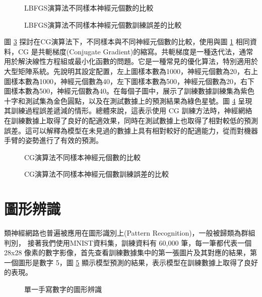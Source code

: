 \begin{figure}[h]
    \caption{LBFGS演算法不同樣本神經元個數的比較}
    \label{fig:LBFGS演算法不同樣本神經元個數的比較}
\end{figure}
\begin{figure}[H]
    \caption{LBFGS演算法不同樣本神經元個數訓練誤差的比較}
    \label{fig:LBFGS演算法不同樣本神經元個數訓練誤差的比較}
\end{figure}

圖 \ref{fig:CG演算法不同樣本神經元個數的比較} 探討在CG演算法下，不同樣本與不同神經元個數的比較，使用與圖 \ref{fig:LBFGS演算法不同樣本神經元個數的比較} 相同資料，CG 是共軛梯度(Conjugate Gradient)的縮寫。共軛梯度是一種迭代法，通常用於解決線性方程組或最小化函數的問題。它是一種常見的優化算法，特別適用於大型矩陣系統。先說明其設定配置，左上圖樣本數為1000，神經元個數為20，右上圖樣本數為1000，神經元個數為40，左下圖樣本數為500，神經元個數為20，右下圖樣本數為500，神經元個數為40。在每個子圖中，展示了訓練數據訓練集為紫色十字和測試集為金色圓點，以及在測試數據上的預測結果為綠色星號。圖 \ref{fig:CG演算法不同樣本神經元個數訓練誤差的比較} 呈現其訓練過程誤差遞減的情形。總體來說，這表示使用 CG 訓練方法時，神經網絡在訓練數據上取得了良好的配適效果，同時在測試數據上也取得了相對較低的預測誤差。這可以解釋為模型在未見過的數據上具有相對較好的配適能力，從而對機器手臂的姿勢進行了有效的預測。

\begin{figure}[h]
    \caption{CG演算法不同樣本神經元個數的比較}
    \label{fig:CG演算法不同樣本神經元個數的比較}
\end{figure}
\begin{figure}[h]
    \caption{CG演算法不同樣本神經元個數訓練誤差的比較}
    \label{fig:CG演算法不同樣本神經元個數訓練誤差的比較}
\end{figure}
\section{圖形辨識}
類神經網路也普遍被應用在圖形識別上(Pattern Recognition)，一般被歸類為群組判別，
接著我們使用MNIST資料集，訓練資料有 60,000 筆，每一筆都代表一個 28x28 像素的數字影像，首先查看訓練數據集中的第一張圖片及其對應的結果，第一個圖形是數字 5，圖 \ref{fig:1手寫數字的圖形辨識} 顯示模型預測的結果，表示模型在訓練數據上取得了良好的表現。
\begin{figure}[H]
    \caption{單一手寫數字的圖形辨識}
    \label{fig:1手寫數字的圖形辨識}
\end{figure}

